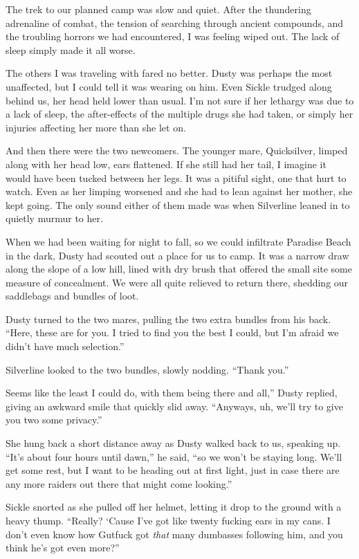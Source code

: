 The trek to our planned camp was slow and quiet. After the thundering adrenaline of combat, the tension of searching through ancient compounds, and the troubling horrors we had encountered, I was feeling wiped out. The lack of sleep simply made it all worse.

The others I was traveling with fared no better. Dusty was perhaps the most unaffected, but I could tell it was wearing on him. Even Sickle trudged along behind us, her head held lower than usual. I’m not sure if her lethargy was due to a lack of sleep, the after-effects of the multiple drugs she had taken, or simply her injuries affecting her more than she let on.

And then there were the two newcomers. The younger mare, Quicksilver, limped along with her head low, ears flattened. If she still had her tail, I imagine it would have been tucked between her legs. It was a pitiful sight, one that hurt to watch. Even as her limping worsened and she had to lean against her mother, she kept going. The only sound either of them made was when Silverline leaned in to quietly murmur to her.

When we had been waiting for night to fall, so we could infiltrate Paradise Beach in the dark, Dusty had scouted out a place for us to camp. It was a narrow draw along the slope of a low hill, lined with dry brush that offered the small site some measure of concealment. We were all quite relieved to return there, shedding our saddlebags and bundles of loot.

Dusty turned to the two mares, pulling the two extra bundles from his back. “Here, these are for you. I tried to find you the best I could, but I’m afraid we didn’t have much selection.”

Silverline looked to the two bundles, slowly nodding. “Thank you.”

\leavevmode{}Seems like the least I could do, with them being there and all,” Dusty replied, giving an awkward smile that quickly slid away. “Anyways, uh, we’ll try to give you two some privacy.”

She hung back a short distance away as Dusty walked back to us, speaking up. “It’s about four hours until dawn,” he said, “so we won’t be staying long. We’ll get some rest, but I want to be heading out at first light, just in case there are any more raiders out there that might come looking.”

Sickle snorted as she pulled off her helmet, letting it drop to the ground with a heavy thump. “Really? ‘Cause I’ve got like twenty fucking ears in my cans. I don’t even know how Gutfuck got \textit{that} many dumbasses following him, and you think he’s got even more?”

